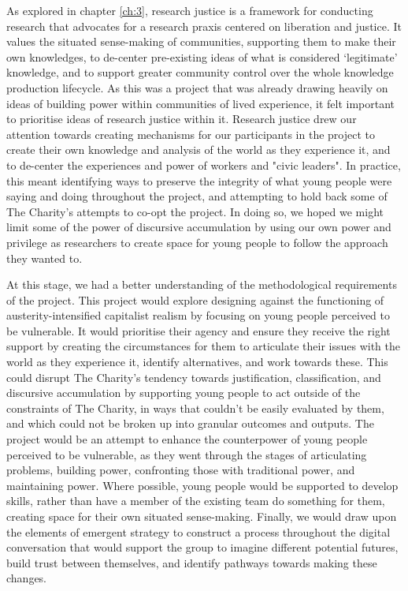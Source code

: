 As explored in chapter \ref{ch:3}, research justice is a framework for conducting research that advocates for a research praxis centered on liberation and justice. It values the situated sense-making of communities, supporting them to make their own knowledges, to de-center pre-existing ideas of what is considered `legitimate' knowledge, and to support greater community control over the whole knowledge production lifecycle. As this was a project that was already drawing heavily on ideas of building power within communities of lived experience, it felt important to prioritise ideas of research justice within it. Research justice drew our attention towards creating mechanisms for our participants in the project to create their own knowledge and analysis of the world as they experience it, and to de-center the experiences and power of workers and "civic leaders". In practice, this meant identifying ways to preserve the integrity of what young people were saying and doing throughout the project, and attempting to hold back some of The Charity's attempts to co-opt the project. In doing so, we hoped we might limit some of the power of discursive accumulation by using our own power and privilege as researchers to create space for young people to follow the approach they wanted to.

At this stage, we had a better understanding of the methodological requirements of the project. This project would explore designing against the functioning of austerity-intensified capitalist realism by focusing on young people perceived to be vulnerable. It would prioritise their agency and ensure they receive the right support by creating the circumstances for them to articulate their issues with the world as they experience it, identify alternatives, and work towards these. This could disrupt The Charity's tendency towards justification, classification, and discursive accumulation by supporting young people to act outside of the constraints of The Charity, in ways that couldn't be easily evaluated by them, and which could not be broken up into granular outcomes and outputs. The project would be an attempt to enhance the counterpower of young people perceived to be vulnerable, as they went through the stages of articulating problems, building power, confronting those with traditional power, and maintaining power. Where possible, young people would be supported to develop skills, rather than have a member of the existing team do something for them, creating space for their own situated sense-making. Finally, we would draw upon the elements of emergent strategy to construct a process throughout the digital conversation that would support the group to imagine different potential futures, build trust between themselves, and identify pathways towards making these changes.  

